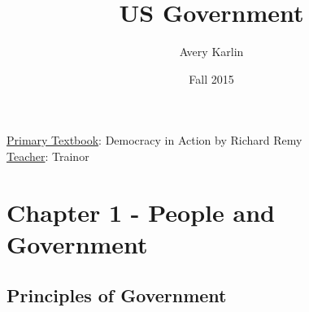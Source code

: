 \documentclass[11 pt, twoside]{article}
\begin{document}
\title{US Government}
\author{Avery Karlin}
\date{Fall 2015}
\newcommand{\textbook}{Democracy in Action by Richard Remy}
\newcommand{\teacher}{Trainor}

\maketitle
\newpage
\hypertarget{content}{\tableofcontents}
\vspace{11pt}
\noindent
\underline{Primary Textbook}: \textbook\\
\underline{Teacher}: \teacher
\newpage

\section{Chapter 1 - People and Government}
\subsection{Principles of Government}
\end{document}

